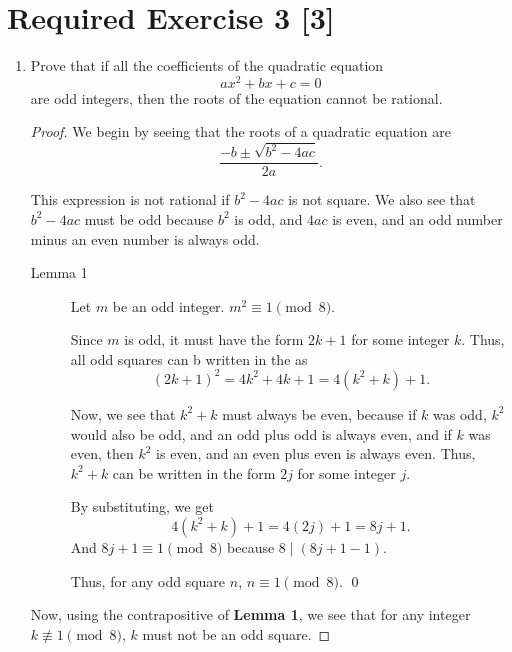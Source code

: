 \documentclass{article}
\begin{document}
\section*{Required Exercise 3 [3]}

\begin{enumerate}
    \item {
        Prove that if all the coefficients of the quadratic equation
        \[ax^2 + bx + c = 0\]
        are odd integers, then the roots of the equation cannot be rational.

        \begin{proof}
            We begin by seeing that the roots of a quadratic equation are
            \[\frac{-b \pm \sqrt{b^2 - 4ac}}{2a}.\]

            This expression is not rational if \(b^2 - 4ac\) is not square. We also see 
            that \(b^2 - 4ac\) must be odd because \(b^2\) is odd, and \(4ac\) is even, 
            and an odd number minus an even number is always odd. 

            \begin{description}
                \item[Lemma 1] {
                    Let \(m\) be an odd integer. \(m^2 \equiv 1 \pmod{8}\).
                
                    Since \(m\) is odd, it must have the form \(2k + 1\) for some 
                    integer \(k\). Thus, all odd squares can b written in the as
                    \[(2k+1)^2 = 4k^2 + 4k + 1 = 4(k^2 + k) + 1.\]

                    Now, we see that \(k^2 + k\) must always be even, because if 
                    \(k\) was odd, \(k^2\) would also be odd, and an odd plus odd
                    is always even, and if \(k\) was even, then \(k^2\) is even,
                    and an even plus even is always even. Thus, \(k^2 + k\) can 
                    be written in the form \(2j\) for some integer \(j\).

                    By substituting, we get 
                    \[4(k^2 + k) + 1 = 4(2j) + 1 = 8j + 1.\]
                    And \(8j + 1 \equiv 1 \pmod{8}\) because \(8 \mid (8j + 1 - 1) \).

                    Thus, for any odd square \(n\), \(n \equiv 1 \pmod{8}\). \qed
                }
            \end{description}

            Now, using the contrapositive of \textbf{Lemma 1}, we see that for 
            any integer \(k \not\equiv 1 \pmod{8}\), \(k\) must not be an odd square.


\end{proof}}
\end{enumerate}
\end{document}
